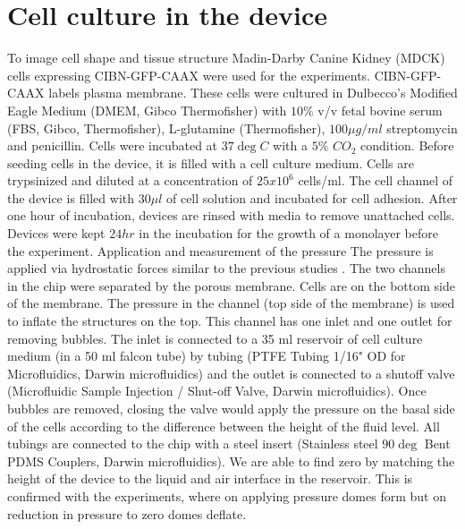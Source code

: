 \section{Cell culture in the device}
To image cell shape and tissue structure Madin-Darby Canine Kidney (MDCK) cells expressing CIBN-GFP-CAAX were used for the experiments. CIBN-GFP-CAAX labels plasma membrane. These cells were cultured in Dulbecco's Modified Eagle Medium (DMEM, Gibco Thermofisher) with $10\%$ v/v fetal bovine serum (FBS, Gibco, Thermofisher), L-glutamine (Thermofisher), $100 \mu g/ml$ streptomycin and penicillin. Cells were incubated at $37 \deg C$ with a $5 \%$ $CO_2$ condition.
Before seeding cells in the device, it is filled with a cell culture medium. Cells are trypsinized and diluted at a concentration of $25x10^6$ cells/ml. The cell channel of the device is filled with $30 \mu l$ of cell solution and incubated for cell adhesion. After one hour of incubation, devices are rinsed with media to remove unattached cells. Devices were kept $ 24 hr$ in the incubation for the growth of a monolayer before the experiment.
Application and measurement of the pressure
The pressure is applied via hydrostatic forces similar to the previous studies \cite{choudhury2022, palmer2021}. The two channels in the chip were separated by the porous membrane. Cells are on the bottom side of the membrane. The pressure in the channel (top side of the membrane) is used to inflate the structures on the top. This channel has one inlet and one outlet for removing bubbles. The inlet is connected to a 35 ml reservoir of cell culture medium (in a 50 ml falcon tube) by tubing (PTFE Tubing 1/16" OD for Microfluidics, Darwin microfluidics) and the outlet is connected to a shutoff valve (Microfluidic Sample Injection / Shut-off Valve, Darwin microfluidics). Once bubbles are removed, closing the valve would apply the pressure on the basal side of the cells according to the difference between the height of the fluid level. All tubings are connected to the chip with a steel insert (Stainless steel $90 \deg$ Bent PDMS Couplers, Darwin microfluidics). We are able to find zero by matching the height of the device to the liquid and air interface in the reservoir. This is confirmed with the experiments, where on applying pressure domes form but on reduction in pressure to zero domes deflate.

